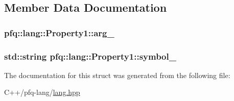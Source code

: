 \subsection{Member Data Documentation}
\hypertarget{structpfq_1_1lang_1_1Property1_a11dd41a5898508a7d4d4210be8e1a8f5}{
\subsubsection[{arg\+\_\+}]{ pfq\+::lang\+::\+Property1\+::arg\+\_\+}}\label{structpfq_1_1lang_1_1Property1_a11dd41a5898508a7d4d4210be8e1a8f5}
\hypertarget{structpfq_1_1lang_1_1Property1_a23d6015f019970c8790ecb19e46125a7}{
\subsubsection[{symbol\+\_\+}]{\setlength{\rightskip}{0pt plus 5cm}std\+::string pfq\+::lang\+::\+Property1\+::symbol\+\_\+}}\label{structpfq_1_1lang_1_1Property1_a23d6015f019970c8790ecb19e46125a7}


The documentation for this struct was generated from the following file\+:\begin{DoxyCompactItemize}
\item 
C++/pfq-\/lang/\hyperlink{lang_8hpp}{lang.\+hpp}\end{DoxyCompactItemize}
